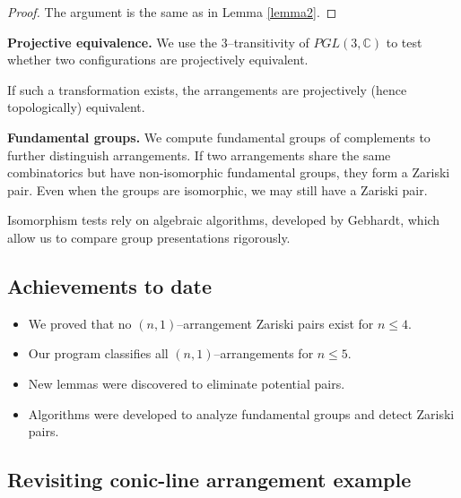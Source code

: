 \documentclass{svproc}
\begin{document}
\begin{proof}
    The argument is the same as in Lemma \ref{lemma2}.
\end{proof}


\medskip
\noindent\textbf{Projective equivalence.}\label{sec:pgl}
We use the $3$--transitivity of $PGL(3,\mathbb{C})$ to test whether two configurations are projectively equivalent.  

If such a transformation exists, the arrangements are projectively (hence topologically) equivalent.

\medskip

\noindent\textbf{Fundamental groups.}\label{sec:groups}
We compute fundamental groups of complements to further distinguish arrangements.  
If two arrangements share the same combinatorics but have non-isomorphic fundamental groups, they form a Zariski pair.  
Even when the groups are isomorphic, we may still have a Zariski pair.

Isomorphism tests rely on algebraic algorithms, developed by Gebhardt, which allow us to compare group presentations rigorously.

\subsection{Achievements to date}

\begin{itemize}
    \item We proved that no $(n,1)$--arrangement Zariski pairs exist for $n \leq 4$.
    \item Our program classifies all $(n,1)$--arrangements for $n \leq 5$.
    \item New lemmas were discovered to eliminate potential pairs.
    \item Algorithms were developed to analyze fundamental groups and detect Zariski pairs.
\end{itemize}

\subsection{Revisiting conic-line arrangement example}
\end{document}
